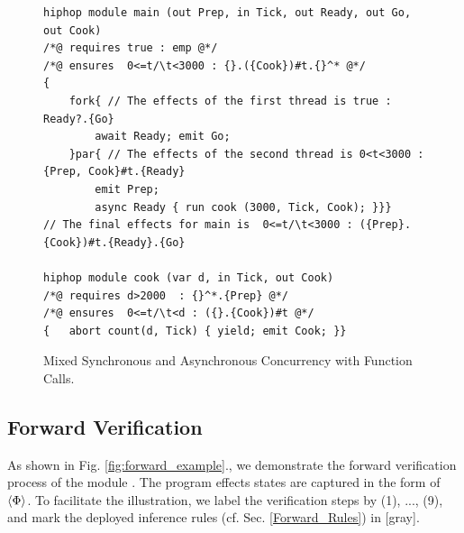 \documentclass[acmsmall,review,anonymous]{acmart}\settopmatter{printfolios=true,printccs=false,printacmref=false}
\newcommand{\effect}{\textcolor{black}{\ensuremath{\mathrm{\Phi}}}}
\newcommand{\code}[1]{{\tt{\ensuremath{\m{#1}}}}}
\newcommand{\m}{\mathit}
\newcommand\figref[1]{Fig. \textcolor{black}{\ref{#1}}.}
\newcommand\secref[1]{Sec. \textcolor{black}{\ref{#1}}}
\begin{document}
\begin{figure}[h]
      \vspace{-2mm}
\begin{lstlisting}[columns=fullflexible]
hiphop module main (out Prep, in Tick, out Ready, out Go, out Cook)
/*@ requires true : emp @*/
/*@ ensures  0<=t/\t<3000 : {}.({Cook})#t.{}^* @*/
{
	fork{ // The effects of the first thread is true : Ready?.{Go}
		await Ready; emit Go; 
	}par{ // The effects of the second thread is 0<t<3000 : {Prep, Cook}#t.{Ready}
		emit Prep;
		async Ready { run cook (3000, Tick, Cook); }}}
// The final effects for main is  0<=t/\t<3000 : ({Prep}.{Cook})#t.{Ready}.{Go} 
      
hiphop module cook (var d, in Tick, out Cook)
/*@ requires d>2000  : {}^*.{Prep} @*/
/*@ ensures  0<=t/\t<d : ({}.{Cook})#t @*/
{	abort count(d, Tick) { yield; emit Cook; }}
\end{lstlisting}  
      \vspace{-1mm}
      \caption{Mixed Synchronous and Asynchronous Concurrency with Function Calls.}\label{fig:overview_eg2}
            \vspace{-1mm}
\end{figure}



      \vspace{-2mm}
\subsection{Forward Verification}
As shown in \figref{fig:forward_example}, we demonstrate the forward verification process of the module  {}. The program effects states  are captured in the form of \code{\langle \textcolor{huntergreen}{\effect} \rangle}. To facilitate the illustration, we label the verification steps by (1), ..., (9), and mark the deployed inference rules (cf. \secref{Forward_Rules}) in \textcolor{mGray}{[gray]}.
\end{document}
